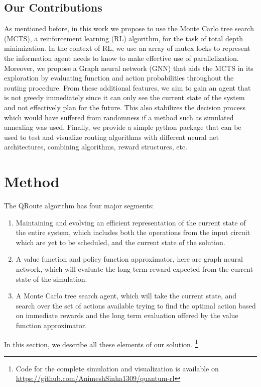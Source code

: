 \documentclass[%
 reprint,
 amsmath,amssymb,
 aps,
]{revtex4-2}
\begin{document}
\subsection{\label{sec:intro-contribution}Our Contributions}

As mentioned before, in this work we propose to use the Monte Carlo tree search (MCTS), a reinforcement learning (RL) algorithm, for the task of total depth minimization. In the context of RL, we use an array of mutex locks to represent the information agent needs to know to make effective use of parallelization. Moreover, we propose a Graph neural network (GNN) that aids the MCTS in its exploration by evaluating function and action probabilities throughout the routing procedure. From these additional features, we aim to gain an agent that is not greedy immediately since it can only see the current state of the system and not effectively plan for the future. This also stabilizes the decision process which would have suffered from randomness if a method such as simulated annealing was used. Finally, we provide a simple python package that can be used to test and visualize routing algorithms with different neural net architectures, combining algorithms, reward structures, etc.

\section{\label{sec:method}Method}

The QRoute algorithm has four major segments:
\begin{enumerate}
    \item Maintaining and evolving an efficient representation of the current state of the entire system, which includes both the operations from the input circuit which are yet to be scheduled, and the current state of the solution.
    \item A value function and policy function approximator, here are graph neural network, which will evaluate the long term reward expected from the current state of the simulation.
    \item A Monte Carlo tree search agent, which will take the current state, and search over the set of actions available trying to find the optimal action based on immediate rewards and the long term evaluation offered by the value function approximator.
\end{enumerate}

In this section, we describe all these elements of our solution. \footnote{Code for the complete simulation and visualization is available on \protect\url{https://github.com/AnimeshSinha1309/quantum-rl}}
\end{document}
